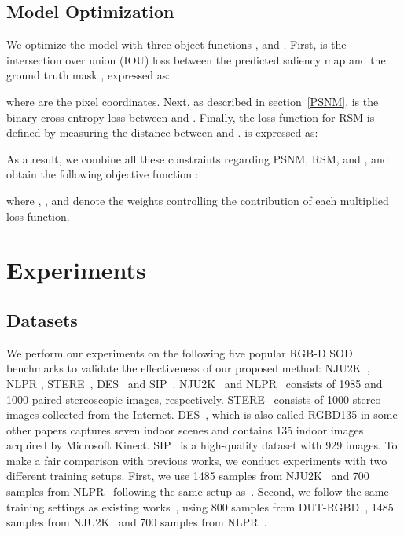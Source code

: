 \documentclass[runningheads]{llncs}
\begin{document}
	\subsection{Model Optimization}
	\label{Optimization}
	We optimize the model with three object functions ,  and . First,  is the intersection over union (IOU) loss between the predicted saliency map  and the ground truth mask , expressed as:
	
	
	
	\noindent
	where  are the pixel coordinates. Next, as described in section~\ref{PSNM},  is the binary cross entropy loss between  and . Finally, the loss function  for RSM is defined by measuring the  distance between  and .  is expressed as:
	
	
	
	\noindent
	As a result, we combine all these constraints regarding PSNM, RSM, and , and obtain the following objective function :
	
	
	where , , and  denote the weights controlling the contribution of each multiplied loss function.
	
	
	\section{Experiments}
	\subsection{Datasets}
	We perform our experiments on the following five popular RGB-D SOD benchmarks to validate the effectiveness of our proposed method: NJU2K~\cite{ju2014depth}, NLPR \cite{peng2014rgbd}, STERE~\cite{niu2012leveraging}, DES~\cite{cheng2014depth} and SIP~\cite{fan2020rethinking}. 
	NJU2K~\cite{ju2014depth} and NLPR~\cite{peng2014rgbd} consists of 1985 and 1000 paired stereoscopic images, respectively. STERE~\cite{niu2012leveraging} consists of 1000 stereo images collected from the Internet. DES~\cite{cheng2014depth}, which is also called RGBD135 in some other papers captures seven indoor scenes and contains 135 indoor images acquired by Microsoft Kinect. SIP~\cite{fan2020rethinking} is a high-quality dataset with 929 images. To make a fair comparison with previous works, we conduct experiments with two different training setups. First, we use 1485 samples from NJU2K~\cite{ju2014depth} and 700 samples from NLPR~\cite{peng2014rgbd} following the same setup as~\cite{zhao2019contrast,li2020cross,luo2020cascade}. Second, we follow the same training settings as existing works~\cite{piao2019depth,zhang2020select,ji2020accurate,chen2020progressively,zhang2020asymmetric,sun2021deep,ji2021calibrated}, using 800 samples from DUT-RGBD~\cite{piao2019depth}, 1485 samples from NJU2K~\cite{ju2014depth} and 700 samples from NLPR~\cite{peng2014rgbd}.
	
\end{document}
